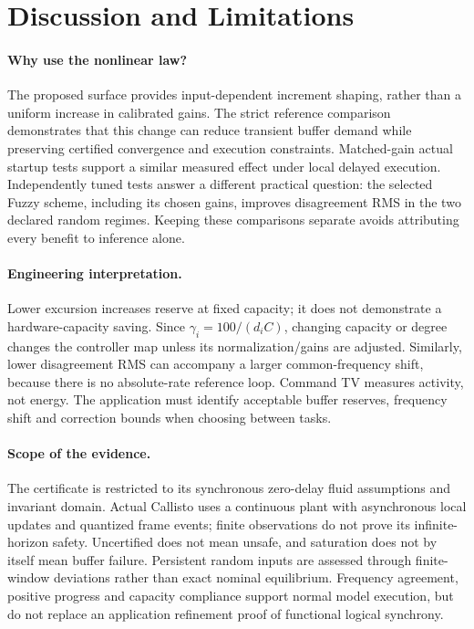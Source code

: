 \section{Discussion and Limitations}
\label{sec:discussion}

\paragraph{Why use the nonlinear law?}
The proposed surface provides input-dependent increment shaping,
rather than a uniform increase in calibrated gains. The strict
reference comparison demonstrates that this change can reduce
transient buffer demand while preserving certified convergence and
execution constraints. Matched-gain actual startup tests support a
similar measured effect under local delayed execution. Independently
tuned tests answer a different practical question: the selected
Fuzzy scheme, including its chosen gains, improves disagreement RMS
in the two declared random regimes. Keeping these comparisons
separate avoids attributing every benefit to inference alone.

\paragraph{Engineering interpretation.}
Lower excursion increases reserve at fixed capacity; it does not
demonstrate a hardware-capacity saving. Since $\gamma_i=100/(d_iC)$,
changing capacity or degree changes the controller map unless its
normalization/gains are adjusted. Similarly, lower disagreement RMS
can accompany a larger common-frequency shift, because there is no
absolute-rate reference loop. Command TV measures activity, not
energy. The application must identify acceptable buffer reserves,
frequency shift and correction bounds when choosing between tasks.

\paragraph{Scope of the evidence.}
The certificate is restricted to its synchronous zero-delay fluid
assumptions and invariant domain. Actual Callisto uses a continuous
plant with asynchronous local updates and quantized frame events;
finite observations do not prove its infinite-horizon safety.
Uncertified does not mean unsafe, and saturation does not by itself
mean buffer failure. Persistent random inputs are assessed through
finite-window deviations rather than exact nominal equilibrium.
Frequency agreement, positive progress and capacity compliance
support normal model execution, but do not replace an application
refinement proof of functional logical synchrony.

